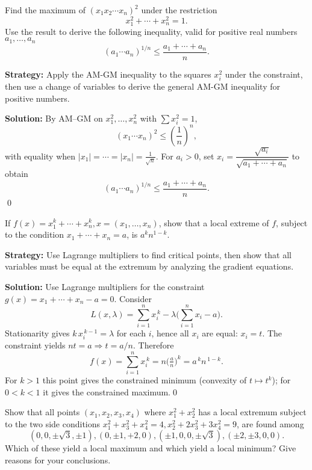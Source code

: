 \begin{problembox}
\begin{problemstatement}
Find the maximum of \((x_1 x_2 \cdots x_n)^2\) under the restriction
\[ x_1^2 + \cdots + x_n^2 = 1. \]
Use the result to derive the following inequality, valid for positive real numbers \(a_1, \ldots, a_n\)
\[ (a_1 \cdots a_n)^{1/n} \leq \frac{a_1 + \cdots + a_n}{n}. \]
\end{problemstatement}
\end{problembox}

\noindent\textbf{Strategy:} Apply the AM-GM inequality to the squares $x_i^2$ under the constraint, then use a change of variables to derive the general AM-GM inequality for positive numbers.

\bigskip\noindent\textbf{Solution:}
By AM--GM on $x_1^2,\dots,x_n^2$ with $\sum x_i^2=1$,
\[(x_1\cdots x_n)^2\le \left(\frac{1}{n}\right)^n,\]
with equality when $|x_1|=\cdots=|x_n|=\tfrac{1}{\sqrt n}$. For $a_i>0$, set $x_i=\dfrac{\sqrt{a_i}}{\sqrt{a_1+\cdots+a_n}}$ to obtain
\[(a_1\cdots a_n)^{1/n}\le \frac{a_1+\cdots+a_n}{n}.
\]\qed


\begin{problembox}
\begin{problemstatement}
If \(f(x) = x_1^k + \cdots + x_n^k, x = (x_1, \ldots, x_n)\), show that a local extreme of \(f\), subject to the condition \(x_1 + \cdots + x_n = a\), is \(a^k n^{1-k}\).
\end{problemstatement}
\end{problembox}

\noindent\textbf{Strategy:} Use Lagrange multipliers to find critical points, then show that all variables must be equal at the extremum by analyzing the gradient equations.

\bigskip\noindent\textbf{Solution:}
Use Lagrange multipliers for the constraint \(g(x)=x_1+\cdots+x_n-a=0\). Consider
\[L(x,\lambda)=\sum_{i=1}^n x_i^{\,k}-\lambda\Big(\sum_{i=1}^n x_i-a\Big).\]
Stationarity gives \(k\,x_i^{\,k-1}=\lambda\) for each \(i\), hence all \(x_i\) are equal: \(x_i=t\). The constraint yields \(nt=a\Rightarrow t=a/n\). Therefore
\[f(x)=\sum_{i=1}^n x_i^{\,k}=n\Big(\tfrac{a}{n}\Big)^{\!k}=a^{\,k}n^{\,1-k}.
\]
For \(k>1\) this point gives the constrained minimum (convexity of \(t\mapsto t^{k}\)); for \(0<k<1\) it gives the constrained maximum.\qed


\begin{problembox}
\begin{problemstatement}
Show that all points \((x_1, x_2, x_3, x_4)\) where \(x_1^2 + x_2^2\) has a local extremum subject to the two side conditions \(x_1^2 + x_3^2 + x_4^2 = 4, x_2^2 + 2x_3^2 + 3x_4^2 = 9\), are found among 
\[ (0, 0, \pm \sqrt{3}, \pm 1), (0, \pm 1, +2, 0), (\pm 1, 0, 0, \pm \sqrt{3}), (\pm 2, \pm 3, 0, 0). \]
Which of these yield a local maximum and which yield a local minimum? Give reasons for your conclusions.
\end{problemstatement}
\end{problembox}


